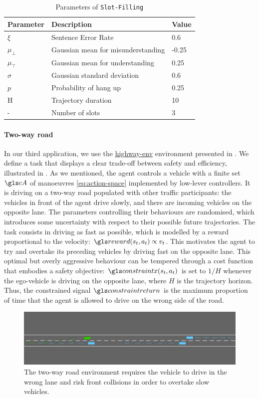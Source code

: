 \begin{table}[ht!]
    \centering
    \begin{tabular}{lll}
        \toprule
        Parameter & Description & Value\tabularnewline
        \midrule
        $\xi$ & Sentence Error Rate & 0.6\tabularnewline
        $\mu_{\bot}$& Gaussian mean for misunderstanding & -0.25\tabularnewline
        $\mu_{\top}$& Gaussian mean for understanding & 0.25\tabularnewline
        $\sigma$& Gaussian standard deviation & 0.6\tabularnewline
        $p$& Probability of hang up & 0.25\tabularnewline
        H & Trajectory duration & 10\tabularnewline
        - & Number of slots & 3\tabularnewline
        \bottomrule
    \end{tabular}
    \caption{Parameters of \texttt{Slot-Filling}}
    \label{tab:param-slot-filling}
\end{table}

\paragraph{Two-way road}
In our third application, we use the \href{https://github.com/eleurent/highway-env}{highway-env} environment presented in .
We define a task that displays a clear trade-off between safety and efficiency, illustrated in . As we mentioned, the agent controls a vehicle with a finite set $\cA$ of manoeuvres \eqref{eq:action-space} implemented by low-lever controllers. It is driving on a two-way road populated with other traffic participants: the vehicles in front of the agent drive slowly, and there are incoming vehicles on the opposite lane. The parameters controlling their behaviours are randomised, which introduces some uncertainty with respect to their possible future trajectories.
The task consists in driving as fast as possible, which is modelled by a reward proportional to the velocity: $\R(s_t, a_t) \propto v_t$. This motivates the agent to try and overtake its preceding vehicles by driving fast on the opposite lane. This optimal but overly aggressive behaviour can be tempered through a cost function that embodies a safety objective: $\constraint(s_t, a_t)$ is set to $1/H$ whenever the ego-vehicle is driving on the opposite lane, where $H$ is the trajectory horizon. Thus, the constrained signal $\constraintreturn$ is the maximum proportion of time that the agent is allowed to drive on the wrong side of the road.

\begin{figure}[t]
	\centering
	\includegraphics[width=\linewidth]{img/two-way}
	\caption{The two-way road environment requires the vehicle to drive in the wrong lane and risk front collisions in order to overtake slow vehicles.}
	\label{fig:two-way}
\end{figure}


